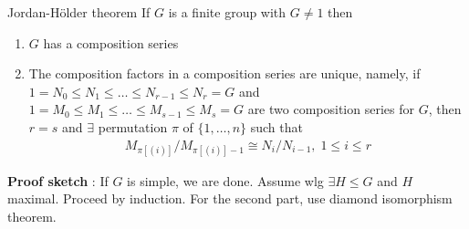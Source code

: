 \documentclass[titlepage, 12pt]{book}
\begin{document}
\begin{theorem}{Jordan-H\"older theorem}{}
    If $G$ is a finite group with $G\neq 1$ then
    \begin{enumerate}
        \item $G$ has a composition series
        \item The composition factors in a composition series are unique,
            namely, if $1 = N_0\le N_1\le\dots\le N_{r-1}\le N_r = G$ and $1 =
            M_0\le M_1\le\dots\le M_{s-1}\le M_s = G$ are two composition series
            for $G$, then $r = s$ and $\exists$ permutation $\pi$ of
            $\{1,\dots,n\}$ such that
            \begin{gather*}
                M_{\pi[(i)]}/M_{\pi[(i)] - 1}\cong N_i/N_{i - 1},\; 1\le i\le r
            \end{gather*}
    \end{enumerate}
\end{theorem}
\textbf{Proof sketch} : If $G$ is simple, we are done. Assume wlg $\exists H\leq
G$ and $H$ maximal. Proceed by induction. For the second part, use diamond
isomorphism theorem.
\end{document}
